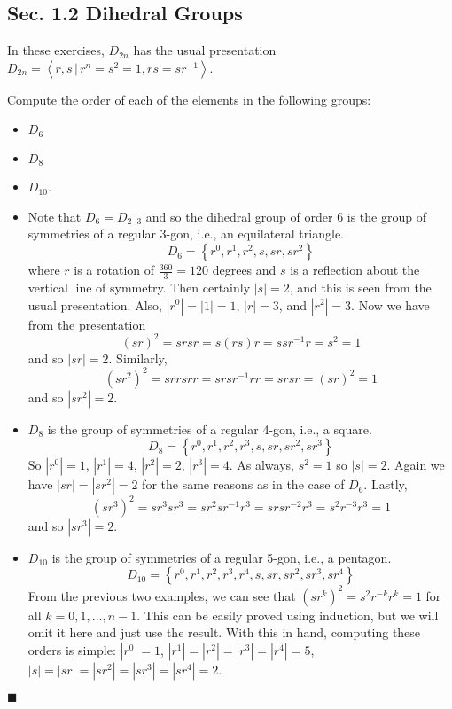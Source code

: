 \documentclass[12pt]{article}
\renewcommand{\qed}{\hfill$\blacksquare$}
\renewenvironment{proof}{\begin{addmargin}[1em]{0em}\begin{newproof}}{\end{newproof}\end{addmargin}\qed}
\newenvironment{problem}[2][Exercise]{\begin{trivlist}
\item[\hskip \labelsep {\bfseries #1}\hskip \labelsep {\bfseries #2.}]}{\end{trivlist}}
\begin{document}
\subsection*{Sec. 1.2 Dihedral Groups}

In these exercises, $D_{2n}$ has the usual presentation $D_{2n} = \left\langle r,s \, | \, r^n=s^2=1, rs=sr^{-1} \right\rangle$.

\begin{problem}{1.2.1}
Compute the order of each of the elements in the following groups:
\begin{itemize}
    \item $D_6$
    \item $D_8$
    \item $D_{10}$.
\end{itemize}
\end{problem}

\begin{proof}
\begin{itemize}
    \item Note that $D_6 = D_{2\cdot 3}$ and so the dihedral group of order $6$ is the group of symmetries of a regular 3-gon, i.e., an equilateral triangle. $$ D_6 = \left\{r^0,r^1,r^2,s,sr,sr^2\right\} $$ where $r$ is a rotation of $\frac{360}{3}=120$ degrees and $s$ is a reflection about the vertical line of symmetry. Then certainly $\left|s\right|=2$, and this is seen from the usual presentation. Also, $\left|r^0\right|=\left|1\right|=1$, $\left|r\right| = 3$, and $\left|r^2\right| = 3$. Now we have from the presentation $$\left(sr\right)^2 = srsr = s\left(rs\right)r = ssr^{-1}r = s^2 = 1 $$ and so $\left|sr\right|=2$. Similarly,
    $$ \left(sr^2\right)^2 = srrsrr = srsr^{-1}rr = srsr = \left(sr\right)^2 = 1$$ and so $\left|sr^2\right|=2$.\\

    \item $D_8$ is the group of symmetries of a regular 4-gon, i.e., a square.
    $$ D_8 = \left\{r^0,r^1,r^2,r^3,s,sr,sr^2,sr^3\right\} $$
    So $\left|r^0\right| = 1$, $\left|r^1\right|=4$, $\left|r^2\right|=2$, $\left|r^3\right|=4$. As always, $s^2=1$ so $\left|s\right|=2$. Again we have $\left|sr\right|=\left|sr^2\right|=2$ for the same reasons as in the case of $D_6$. Lastly, $$\left(sr^3\right)^2 = sr^3sr^3 = sr^2 sr^{-1}r^3 = srsr^{-2}r^{3} = s^2 r^{-3}r^3 = 1$$ and so $\left|sr^3\right|=2$.

    \item $D_{10}$ is the group of symmetries of a regular 5-gon, i.e., a pentagon. $$ D_{10} = \left\{r^0, r^1, r^2, r^3, r^4, s, sr, sr^2, sr^3, sr^4 \right\} $$ From the previous two examples, we can see that $\left(sr^k\right)^2 = s^2 r^{-k}r^{k} = 1$ for all $k=0,1,\ldots,n-1$. This can be easily proved using induction, but we will omit it here and just use the result. With this in hand, computing these orders is simple: $\left|r^0\right|=1$, $\left|r^1\right|=\left|r^2\right|=\left|r^3\right|=\left|r^4\right|=5$, $\left|s\right|=\left|sr\right|=\left|sr^2\right|=\left|sr^3\right|=\left|sr^4\right|=2$.

\end{itemize}
\end{proof}
\end{document}
